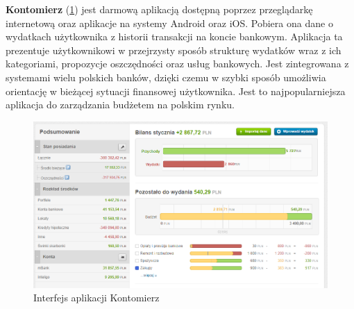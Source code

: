 \textbf{Kontomierz} (\ref{kontomierz_interfejs}) jest darmową aplikacją dostępną poprzez przeglądarkę internetową oraz aplikacje na systemy Android oraz iOS. Pobiera ona dane o wydatkach użytkownika z historii transakcji na koncie bankowym. Aplikacja ta prezentuje użytkownikowi w przejrzysty sposób strukturę wydatków wraz z ich kategoriami, propozycje oszczędności oraz usług bankowych. Jest zintegrowana z systemami wielu polskich banków, dzięki czemu w szybki sposób umożliwia orientację w bieżącej sytuacji finansowej użytkownika. Jest to najpopularniejsza aplikacja do zarządzania budżetem na polskim rynku.
\begin{figure}[h!]
	\begin{center}
		\includegraphics[width=6in]{img/aplikacje/kontomierz_interfejs.png}
		\caption{Interfejs aplikacji Kontomierz}
		\label{kontomierz_interfejs}
	\end{center}
\end{figure}

